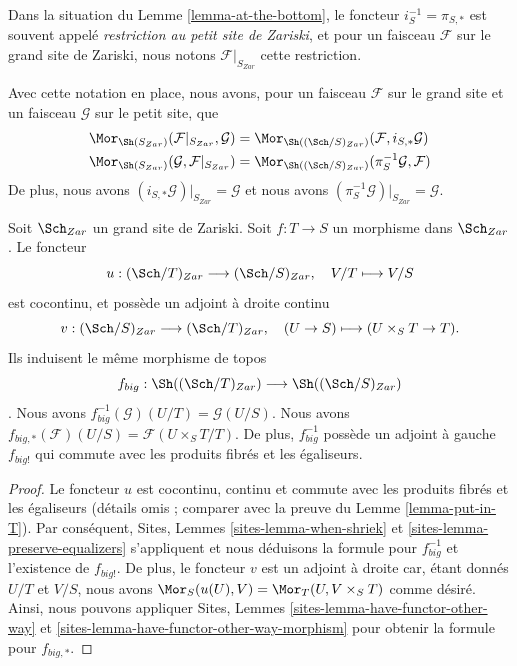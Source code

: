\begin{definition}
\label{definition-restriction-small-zariski}
Dans la situation du Lemme \ref{lemma-at-the-bottom}, le foncteur $i_S^{-1} = \pi_{S, *}$ est souvent appelé {\it restriction au petit site de Zariski}, et pour un faisceau $\mathcal{F}$ sur le grand site de Zariski, nous notons $\mathcal{F}|_{S_{Zar}}$ cette restriction.
\end{definition}

\noindent
Avec cette notation en place, nous avons, pour un faisceau $\mathcal{F}$ sur le grand site et un faisceau $\mathcal{G}$ sur le petit site, que
\begin{align*}
\Mor_{\Sh(S_{Zar})}(\mathcal{F}|_{S_{Zar}}, \mathcal{G})
& =
\Mor_{\Sh((\Sch/S)_{Zar})}(\mathcal{F},
i_{S, *}\mathcal{G}) \\
\Mor_{\Sh(S_{Zar})}(\mathcal{G}, \mathcal{F}|_{S_{Zar}})
& =
\Mor_{\Sh((\Sch/S)_{Zar})}(\pi_S^{-1}\mathcal{G},
\mathcal{F})
\end{align*}
De plus, nous avons $(i_{S, *}\mathcal{G})|_{S_{Zar}} = \mathcal{G}$ et nous avons $(\pi_S^{-1}\mathcal{G})|_{S_{Zar}} = \mathcal{G}$.

\begin{lemma}
\label{lemma-morphism-big}
Soit $\Sch_{Zar}$ un grand site de Zariski. Soit $f : T \to S$ un morphisme dans $\Sch_{Zar}$. Le foncteur
$$
u : (\Sch/T)_{Zar} \longrightarrow (\Sch/S)_{Zar},
\quad
V/T \longmapsto V/S
$$
est cocontinu, et possède un adjoint à droite continu
$$
v : (\Sch/S)_{Zar} \longrightarrow (\Sch/T)_{Zar},
\quad
(U \to S) \longmapsto (U \times_S T \to T).
$$
Ils induisent le même morphisme de topos
$$
f_{big} :
\Sh((\Sch/T)_{Zar})
\longrightarrow
\Sh((\Sch/S)_{Zar})
$$
. Nous avons $f_{big}^{-1}(\mathcal{G})(U/T) = \mathcal{G}(U/S)$. Nous avons $f_{big, *}(\mathcal{F})(U/S) = \mathcal{F}(U \times_S T/T)$. De plus, $f_{big}^{-1}$ possède un adjoint à gauche $f_{big!}$ qui commute avec les produits fibrés et les égaliseurs.
\end{lemma}

\begin{proof}
Le foncteur $u$ est cocontinu, continu et commute avec les produits fibrés et les égaliseurs (détails omis ; comparer avec la preuve du Lemme \ref{lemma-put-in-T}). Par conséquent, Sites, Lemmes \ref{sites-lemma-when-shriek} et \ref{sites-lemma-preserve-equalizers} s'appliquent et nous déduisons la formule pour $f_{big}^{-1}$ et l'existence de $f_{big!}$. De plus, le foncteur $v$ est un adjoint à droite car, étant donnés $U/T$ et $V/S$, nous avons $\Mor_S(u(U), V) = \Mor_T(U, V \times_S T)$ comme désiré. Ainsi, nous pouvons appliquer Sites, Lemmes \ref{sites-lemma-have-functor-other-way} et \ref{sites-lemma-have-functor-other-way-morphism} pour obtenir la formule pour $f_{big, *}$.
\end{proof}

